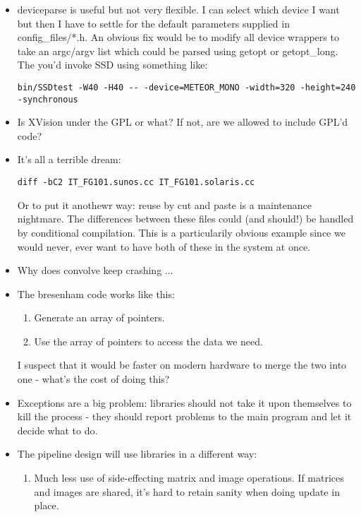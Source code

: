 \begin{itemize}

\item
deviceparse is useful but not very flexible.  I can select which
device I want but then I have to settle for the default parameters
supplied in config\_files/*.h.  An obvious fix would be to
modify all device wrappers to take an argc/argv list which could be
parsed using getopt or getopt\_long.  The you'd invoke SSD using something
like:

\begin{verbatim}
bin/SSDtest -W40 -H40 -- -device=METEOR_MONO -width=320 -height=240 -synchronous
\end{verbatim}


\item
Is XVision under the GPL or what?
If not, are we allowed to include GPL'd code?

\item
It's all a terrible dream:
\begin{verbatim}
diff -bC2 IT_FG101.sunos.cc IT_FG101.solaris.cc
\end{verbatim}

Or to put it anothewr way: reuse by cut and paste is a maintenance 
nightmare.  The differences between these files could (and should!)
be handled by conditional compilation.  This is a particularily
obvious example since we would never, ever want to have both
of these in the system at once.

\item
Why does convolve keep crashing ...

\item
The bresenham code works like this:
\begin{enumerate}
\item
  Generate an array of pointers.
\item
  Use the array of pointers to access the data we need.
\end{enumerate}
I suspect that it would be faster on modern hardware to merge the two
into one - what's the cost of doing this?

\item
Exceptions are a big problem: libraries should not take it upon 
themselves to kill the process - they should report problems to
the main program and let it decide what to do.

\item
The pipeline design will use libraries in a different way:
\begin{enumerate}
\item
  Much less use of side-effecting matrix and image operations.
  If matrices and images are shared, it's hard to retain sanity
  when doing update in place.


\end{enumerate}
\end{itemize}
